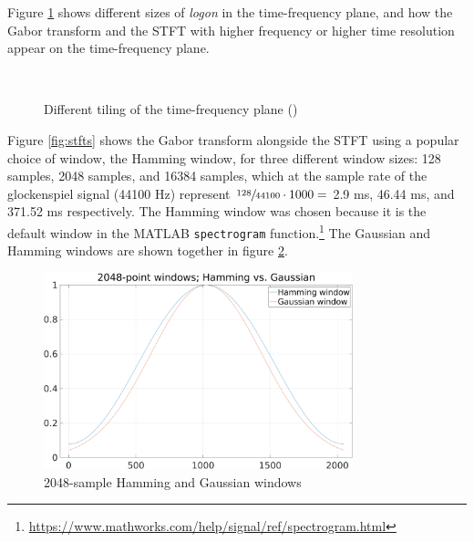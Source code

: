 \documentclass[report.tex]{subfiles}
\begin{document}
Figure \ref{fig:gabortf} shows different sizes of \textit{logon} in the time-frequency plane, and how the Gabor transform and the STFT with higher frequency or higher time resolution appear on the time-frequency plane.

\begin{figure}[ht]
	\centering
	\\
	\caption{Different tiling of the time-frequency plane (\cite{gabordiagrams})}
	\label{fig:gabortf}
\end{figure}

Figure \ref{fig:stfts} shows the Gabor transform alongside the STFT using a popular choice of window, the Hamming window, for three different window sizes: 128 samples, 2048 samples, and 16384 samples, which at the sample rate of the glockenspiel signal (44100 Hz) represent $\sfrac{128}{44100}\cdot 1000 = $ 2.9 ms, 46.44 ms, and 371.52 ms respectively. The Hamming window was chosen because it is the default window in the MATLAB \Verb#spectrogram# function.\footnote{\url{https://www.mathworks.com/help/signal/ref/spectrogram.html}} The Gaussian and Hamming windows are shown together in figure \ref{fig:gaussvshamm}.

\begin{figure}[ht]
	\centering
	\includegraphics[width=0.8\textwidth]{./images-tftheory/hamming_vs_gauss.png}
	\caption{2048-sample Hamming and Gaussian windows}
	\label{fig:gaussvshamm}
\end{figure}
\end{document}
